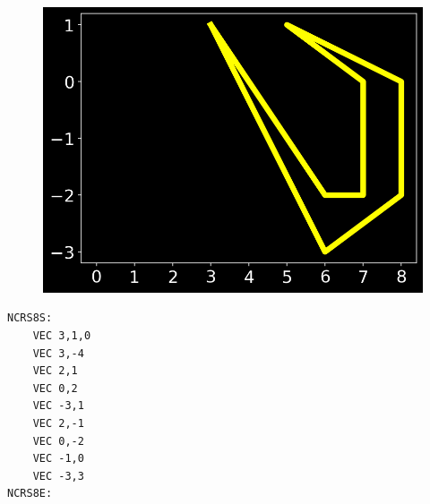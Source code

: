 \begin{minipage}[b]{0.48\linewidth}
\begin{figure}[H]
    \centering
    \begin{adjustbox}{width=4.5cm,center}
      \includegraphics[width=12cm]{src/cursors/final_cursor_7.png}%
    \end{adjustbox}
\end{figure}
\end{minipage}
\begin{minipage}[b]{0.48\linewidth}
\begin{lstlisting}
NCRS8S:
	VEC 3,1,0
	VEC 3,-4
	VEC 2,1
	VEC 0,2
	VEC -3,1
	VEC 2,-1
	VEC 0,-2
	VEC -1,0
	VEC -3,3
NCRS8E:
\end{lstlisting}
\end{minipage}

